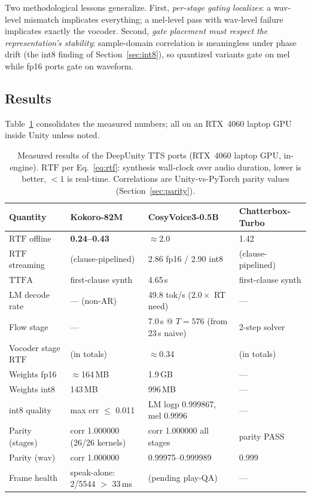 \documentclass[11pt,a4paper]{article}
\newcommand{\RTF}{\ensuremath{\mathrm{RTF}}}
\newcommand{\TTFA}{\ensuremath{\mathrm{TTFA}}}
\begin{document}
Two methodological lessons generalize. First, \emph{per-stage gating localizes}: a
wav-level mismatch implicates everything; a mel-level pass with wav-level failure
implicates exactly the vocoder. Second, \emph{gate placement must respect the
representation's stability}: sample-domain correlation is meaningless under phase drift
(the int8 finding of Section~\ref{sec:int8}), so quantized variants gate on mel while
fp16 ports gate on waveform.

\subsection{Results}
\label{sec:results-table}

Table~\ref{tab:results} consolidates the measured numbers; all on an RTX~4060 laptop
GPU inside Unity unless noted.

\begin{table}[htbp]
\centering
\caption{Measured results of the DeepUnity TTS ports (RTX~4060 laptop GPU, in-engine).
$\RTF$ per Eq.~\eqref{eq:rtf}: synthesis wall-clock over audio duration, lower is
better, $< 1$ is real-time. Correlations are Unity-vs-PyTorch parity values
(Section~\ref{sec:parity}).}
\label{tab:results}
\small
\begin{tabular}{@{}llll@{}}
\toprule
\textbf{Quantity} & \textbf{Kokoro-82M} & \textbf{CosyVoice3-0.5B} & \textbf{Chatterbox-Turbo} \\
\midrule
$\RTF$ offline & \textbf{0.24--0.43} & $\approx 2.0$ & 1.42 \\
$\RTF$ streaming & (clause-pipelined) & 2.86 fp16 / 2.90 int8 & (clause-pipelined) \\
\TTFA{} & first-clause synth & 4.65\,s & first-clause synth \\
LM decode rate & --- (non-AR) & 49.8 tok/s ($2.0\times$ RT need) & --- \\
Flow stage & --- & 7.0\,s @ $T{=}576$ (from 23\,s naive) & 2-step solver \\
Vocoder stage $\RTF$ & (in totals) & $\approx$0.34 & (in totals) \\
Weights fp16 & $\approx$164\,MB & 1.9\,GB & --- \\
Weights int8 & 143\,MB & 996\,MB & --- \\
int8 quality & max err $\le$ 0.011 & LM logp 0.999867, mel 0.9996 & --- \\
Parity (stages) & corr 1.000000 (26/26 kernels) & corr 1.000000 all stages & parity PASS \\
Parity (wav) & corr 1.000000 & 0.99975--0.999989 & 0.999 \\
Frame health & speak-alone: 2/5544 $>$ 33\,ms & (pending play-QA) & --- \\
\bottomrule
\end{tabular}
\end{table}
\end{document}
